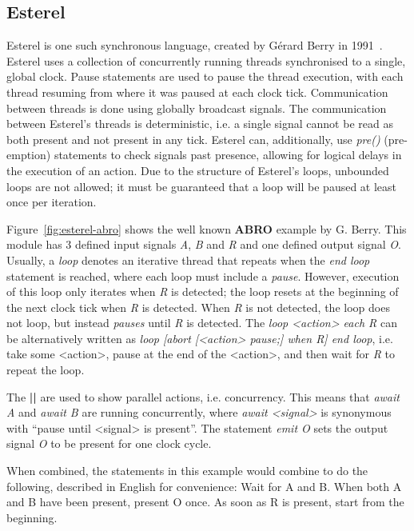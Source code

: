 \subsection{Esterel}
Esterel is one such synchronous language, created by Gérard Berry in 1991~\cite{berry1991}. 
Esterel uses a collection of concurrently running threads synchronised to a single, global clock.
Pause statements are used to pause the thread execution, with each thread resuming from where it was paused at each clock tick.
Communication between threads is done using globally broadcast signals.
The communication between Esterel's threads is deterministic, i.e. a single signal cannot be read as both present and not present in any tick.
Esterel can, additionally, use \textit{pre()} (pre-emption) statements to check signals past presence, allowing for logical delays in the execution of an action.
Due to the structure of Esterel's loops, unbounded loops are not allowed; it must be guaranteed that a loop will be paused at least once per iteration.

Figure~\ref{fig:esterel-abro} shows the well known \textbf{ABRO} example by G. Berry.
This module has 3 defined input signals \textit{A}, \textit{B} and \textit{R} and one defined output signal \textit{O}.
Usually, a \textit{loop} denotes an iterative thread that repeats when the \textit{end loop} statement is reached, where each loop must include a \textit{pause}. 
However, execution of this loop only iterates when \textit{R} is detected; the loop resets at the beginning of the next clock tick when \textit{R} is detected.
When \textit{R} is not detected, the loop does not loop, but instead \textit{pauses} until \textit{R} is detected.
The \textit{loop <action> each R} can be alternatively written as \textit{loop [abort [<action> pause;] when R] end loop}, i.e. take some <action>, pause at the end of the <action>, and then wait for \textit{R} to repeat the loop.

The \textbf{||} are used to show parallel actions, i.e. concurrency.
This means that \textit{await A} and \textit{await B} are running concurrently, where \textit{await <signal>} is synonymous with ``pause until <signal> is present''.
The statement \textit{emit O} sets the output signal \textit{O} to be present for one clock cycle.

When combined, the statements in this example would combine to do the following, described in English for convenience:
Wait for A and B. 
When both A and B have been present, present O once.
As soon as R is present, start from the beginning.

